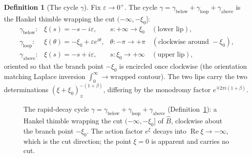 \documentclass[11pt,reqno]{amsart}
\theoremstyle{plain}
\theoremstyle{definition}
\newtheorem{definition}[theorem]{Definition}
\newcommand{\Bhat}{\widehat{B}}
\newcommand{\xizero}{\xi_0}
\begin{document}
\begin{definition}[The cycle $\gamma$]\label{def:gamma}
Fix $\varepsilon\to0^+$. The cycle $\gamma=\gamma_{\mathrm{below}}+\gamma_{\mathrm{loop}}
+\gamma_{\mathrm{above}}$ is the Hankel thimble wrapping the cut $(-\infty,-\xizero]$:
\[
\begin{array}{lll}
  \gamma_{\mathrm{below}}: & \xi(s)=-s-i\varepsilon, & s:+\infty\to\xizero \quad(\text{lower lip}),\\[2pt]
  \gamma_{\mathrm{loop}}:  & \xi(\theta)=-\xizero+\varepsilon e^{i\theta}, & \theta:-\pi\to+\pi
        \quad(\text{clockwise around }-\xizero),\\[2pt]
  \gamma_{\mathrm{above}}: & \xi(s)=-s+i\varepsilon, & s:\xizero\to+\infty \quad(\text{upper lip}),
\end{array}
\]
oriented so that the branch point $-\xizero$ is encircled once clockwise (the orientation matching
Laplace inversion $\int_0^\infty\!\to\!\text{wrapped contour}$). The two lips carry the two
determinations $(\xi+\xizero)^{-(1+\beta)}_{\pm}$, differing by the monodromy factor
$e^{\mp2\pi i(1+\beta)}$.
\end{definition}

\begin{figure}[h]
\centering
{}
\caption{The rapid-decay cycle $\gamma=\gamma_{\mathrm{below}}+\gamma_{\mathrm{loop}}
+\gamma_{\mathrm{above}}$ (Definition~\ref{def:gamma}): a Hankel thimble wrapping the cut
$(-\infty,-\xizero]$ of $\Bhat$, clockwise about the branch point $-\xizero$. The action factor
$e^{\xi}$ decays into $\operatorname{Re}\xi\to-\infty$, which is the cut direction; the point
$\xi=0$ is apparent and carries no cut.}
\label{fig:gamma}
\end{figure}
\end{document}
